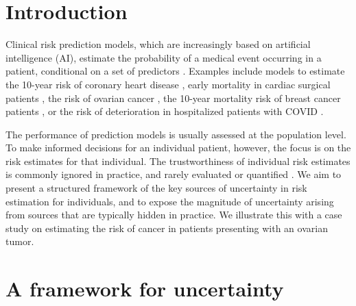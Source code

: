 \newpage

\section{Introduction}

Clinical risk prediction models, which are increasingly based on artificial intelligence (AI), estimate the probability of a medical event occurring in a patient, conditional on a set of predictors \cite{steyerberg2019clinical}. Examples include models to estimate the 10-year risk of coronary heart disease \cite{hippisley-coxDevelopmentValidationQRISK32017}, early mortality in cardiac surgical patients \cite{nashefEuroSCOREII2012}, the risk of ovarian cancer \cite{vancalsterEvaluatingRiskOvarian2014}, the 10-year mortality risk of breast cancer patients \cite{candidodosreisUpdatedPREDICTBreast2017}, or the risk of deterioration in hospitalized patients with COVID \cite{guptaDevelopmentValidationISARIC2021}.

The performance of prediction models is usually assessed at the population level. To make informed decisions for an individual patient, however, the focus is on the risk estimates for that individual. The trustworthiness of individual risk estimates is commonly ignored in practice, and rarely evaluated or quantified \cite{altmanWhatWeMean2000}. We aim to present a structured framework of the key sources of uncertainty in risk estimation for individuals, and to expose the magnitude of uncertainty arising from sources that are typically hidden in practice. We illustrate this with a case study on estimating the risk of cancer in patients presenting with an ovarian tumor.

\section{A framework for uncertainty}

